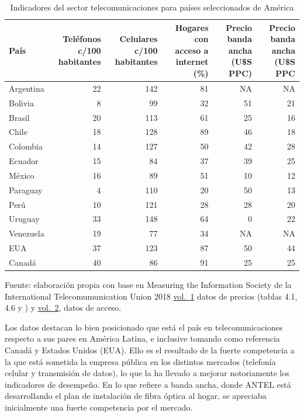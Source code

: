 \documentclass[
  12pt,
  spanish,
]{book}
\begin{document}
\begin{table}

\caption{\label{tab:cuadro6}Indicadores del sector telecomunicaciones para países seleccionados de América}
\centering
\begin{tabular}[t]{l|r|r|r|r|r}
\hline
País & Teléfonos c/100 habitantes & Celulares c/100 habitantes & Hogares con acceso a internet (\%) & Precio banda ancha (U\$S PPC) & Precio banda ancha (U\$S PPC\\
\hline
Argentina & 22 & 142 & 81 & NA & NA\\
\hline
Bolivia & 8 & 99 & 32 & 51 & 21\\
\hline
Brasil & 20 & 113 & 61 & 25 & 16\\
\hline
Chile & 18 & 128 & 89 & 46 & 18\\
\hline
Colombia & 14 & 127 & 50 & 42 & 28\\
\hline
Ecuador & 15 & 84 & 37 & 39 & 25\\
\hline
México & 16 & 89 & 51 & 10 & 12\\
\hline
Paraguay & 4 & 110 & 20 & 50 & 13\\
\hline
Perú & 10 & 121 & 28 & 28 & 20\\
\hline
Uruguay & 33 & 148 & 64 & 0 & 22\\
\hline
Venezuela & 19 & 77 & 34 & NA & NA\\
\hline
EUA & 37 & 123 & 87 & 50 & 44\\
\hline
Canadá & 40 & 86 & 91 & 25 & 25\\
\hline
\end{tabular}
\end{table}

Fuente: elaboración propia con base en Measuring the Information Society de la International Telecomumunication Union 2018 \href{https://www.itu.int/en/ITU-D/Statistics/Documents/publications/misr2018/MISR-2018-Vol-1-E.pdf}{vol.~1} datos de precios (tablas 4.1, 4.6 y ) y \href{https://www.itu.int/en/ITU-D/Statistics/Documents/publications/misr2018/MISR-2018-Vol-2-E.pdf}{vol.~2}, datos de acceso.

Los datos destacan lo bien posicionado que está el país en telecomunicaciones respecto a sus pares en América Latina, e inclusive tomando como referencia Canadá y Estados Unidos (EUA). Ello es el resultado de la fuerte competencia a la que está sometida la empresa pública en los distintos mercados (telefonía celular y transmisión de datos), lo que la ha llevado a mejorar notoriamente los indicadores de desempeño. En lo que refiere a banda ancha, donde ANTEL está desarrollando el plan de instalación de fibra óptica al hogar, se apreciaba inicialmente una fuerte competencia por el mercado.
\end{document}
